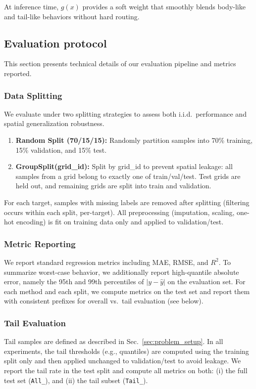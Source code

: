 \documentclass[preprint,12pt]{elsarticle}
\begin{document}
At inference time, $g(x)$ provides a soft weight that smoothly blends body-like and tail-like behaviors without hard routing.

\subsection{Evaluation protocol}

This section presents technical details of our evaluation pipeline and metrics reported.

\label{sec:eval_protocol}

\subsubsection{Data Splitting}
\label{sec:data_splitting}

We evaluate under two splitting strategies to assess both i.i.d.\ performance and spatial generalization robustness.
\begin{enumerate}
    \item \textbf{Random Split (70/15/15):} Randomly partition samples into 70\% training, 15\% validation, and 15\% test.
    \item \textbf{GroupSplit(grid\_id):} Split by grid\_id to prevent spatial leakage: all samples from a grid belong to exactly one of train/val/test. Test grids are held out, and remaining grids are split into train and validation.
\end{enumerate}

\textbf{} For each target, samples with missing labels are removed after splitting (filtering occurs within each split, per-target). All preprocessing (imputation, scaling, one-hot encoding) is fit on training data only and applied to validation/test.

\subsubsection{Metric Reporting}
\label{sec:metric_reporting}
We report standard regression metrics including MAE, RMSE, and \(R^2\).
To summarize worst-case behavior, we additionally report high-quantile absolute error, namely the 95th and 99th percentiles of \(|y-\hat{y}|\) on the evaluation set.
For each method and each split, we compute metrics on the test set and report them with consistent prefixes for overall vs.\ tail evaluation (see below).

\subsubsection{Tail Evaluation}
\label{sec:tail_evaluation_protocol}
Tail samples are defined as described in Sec.~\ref{sec:problem_setup}. In all experiments, the tail thresholds (e.g., quantiles) are computed using the training split only and then applied unchanged to validation/test to avoid leakage.
We report the tail rate in the test split and compute all metrics on both:
(i) the full test set (\texttt{All\_}), and
(ii) the tail subset (\texttt{Tail\_}).
\end{document}

